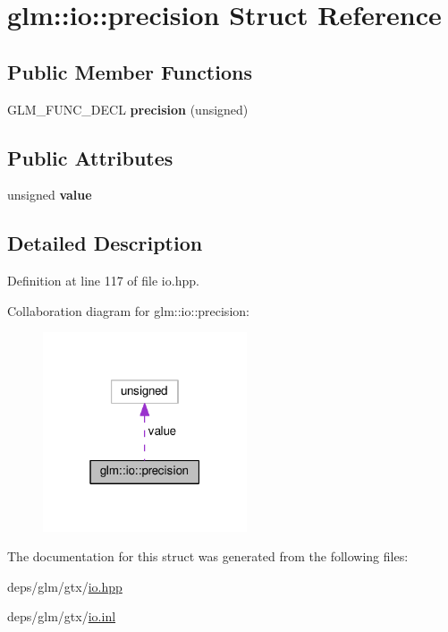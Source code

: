 \hypertarget{structglm_1_1io_1_1precision}{}\section{glm\+:\+:io\+:\+:precision Struct Reference}
\label{structglm_1_1io_1_1precision}
\subsection*{Public Member Functions}
\begin{DoxyCompactItemize}
\item 
\mbox{\label{structglm_1_1io_1_1precision_aa359e1766fd74b88e049d5449d521447}} 
G\+L\+M\+\_\+\+F\+U\+N\+C\+\_\+\+D\+E\+CL {\bfseries precision} (unsigned)
\end{DoxyCompactItemize}
\subsection*{Public Attributes}
\begin{DoxyCompactItemize}
\item 
\mbox{\label{structglm_1_1io_1_1precision_a43da772dff9a209768c63f1220d52074}} 
unsigned {\bfseries value}
\end{DoxyCompactItemize}


\subsection{Detailed Description}


Definition at line 117 of file io.\+hpp.



Collaboration diagram for glm\+:\+:io\+:\+:precision\+:
\nopagebreak
\begin{figure}[H]
\begin{center}
\leavevmode
\includegraphics[width=171pt]{d2/da7/structglm_1_1io_1_1precision__coll__graph}
\end{center}
\end{figure}


The documentation for this struct was generated from the following files\+:\begin{DoxyCompactItemize}
\item 
deps/glm/gtx/\hyperlink{io_8hpp}{io.\+hpp}\item 
deps/glm/gtx/\hyperlink{io_8inl}{io.\+inl}\end{DoxyCompactItemize}
